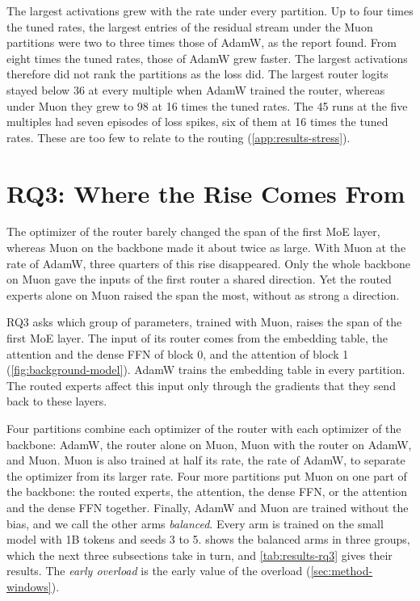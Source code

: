 The largest activations grew with the rate under every partition. Up to four times the tuned rates, the largest entries of the residual stream under the Muon partitions were two to three times those of AdamW, as the report found. From eight times the tuned rates, those of AdamW grew faster. The largest activations therefore did not rank the partitions as the loss did. The largest router logits stayed below 36 at every multiple when AdamW trained the router, whereas under Muon they grew to 98 at 16 times the tuned rates. The 45 runs at the five multiples had seven episodes of loss spikes, six of them at 16 times the tuned rates. These are too few to relate to the routing (\cref{app:results-stress}).

\section{RQ3: Where the Rise Comes From}
\label{sec:results-rq3}
The optimizer of the router barely changed the span of the first MoE layer, whereas Muon on the backbone made it about twice as large. With Muon at the rate of AdamW, three quarters of this rise disappeared. Only the whole backbone on Muon gave the inputs of the first router a shared direction. Yet the routed experts alone on Muon raised the span the most, without as strong a direction.

RQ3 asks which group of parameters, trained with Muon, raises the span of the first MoE layer. The input of its router comes from the embedding table, the attention and the dense FFN of block 0, and the attention of block 1 (\cref{fig:background-model}). AdamW trains the embedding table in every partition. The routed experts affect this input only through the gradients that they send back to these layers.

Four partitions combine each optimizer of the router with each optimizer of the backbone: AdamW, the router alone on Muon, Muon with the router on AdamW, and Muon. Muon is also trained at half its rate, the rate of AdamW, to separate the optimizer from its larger rate. Four more partitions put Muon on one part of the backbone: the routed experts, the attention, the dense FFN, or the attention and the dense FFN together. Finally, AdamW and Muon are trained without the bias, and we call the other arms \emph{balanced}. Every arm is trained on the small model with 1B tokens and seeds 3 to 5.  shows the balanced arms in three groups, which the next three subsections take in turn, and \cref{tab:results-rq3} gives their results. The \emph{early overload} is the early value of the overload (\cref{sec:method-windows}).

